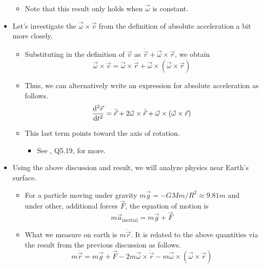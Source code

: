 \documentclass[../notes.tex]{subfiles}
\begin{document}
\begin{itemize}
    \begin{itemize}
        \item Note that this result only holds when $\vec{\omega}$ is constant.
    \end{itemize}
    \item Let's investigate the $\vec{\omega}\times\vec{v}$ from the definition of absolute acceleration a bit more closely.
    \begin{itemize}
        \item Substituting in the definition of $\vec{v}$ as $\dot{\vec{r}}+\vec{\omega}\times\vec{r}$, we obtain
        \begin{equation*}
            \vec{\omega}\times\vec{v} = \vec{\omega}\times\dot{\vec{r}}+\vec{\omega}\times(\vec{\omega}\times\vec{r})
        \end{equation*}
        \item Thus, we can alternatively write an expression for absolute acceleration as follows.
        \begin{equation*}
            \dv[2]{\vec{r}}{t} = \ddot{\vec{r}}+2\vec{\omega}\times\dot{\vec{r}}+\vec{\omega}\times(\vec{\omega}\times\vec{r})
        \end{equation*}
        \item This last term points toward the axis of rotation.
        \begin{itemize}
            \item See \textcite{bib:KibbleBerkshire}, Q5.19, for more.
        \end{itemize}
    \end{itemize}
    \item Using the above discussion and result, we will analyze physics near Earth's surface.
    \begin{itemize}
        \item For a particle moving under gravity $m\vec{g}=-GMm/R^2\approx 9.81m$ and under other, additional forces $\vec{F}$, the equation of motion is
        \begin{equation*}
            m\vec{a}_\text{inertial} = m\vec{g}+\vec{F}
        \end{equation*}
        \item What we measure on earth is $m\ddot{\vec{r}}$. It is related to the above quantities via the result from the previous discussion as follows.
        \begin{equation*}
            m\ddot{\vec{r}} = m\vec{g}+\vec{F}-2m\vec{\omega}\times\dot{\vec{r}}-m\vec{\omega}\times(\vec{\omega}\times\vec{r})

\end{equation*}
\end{itemize}
\end{itemize}
\end{document}
